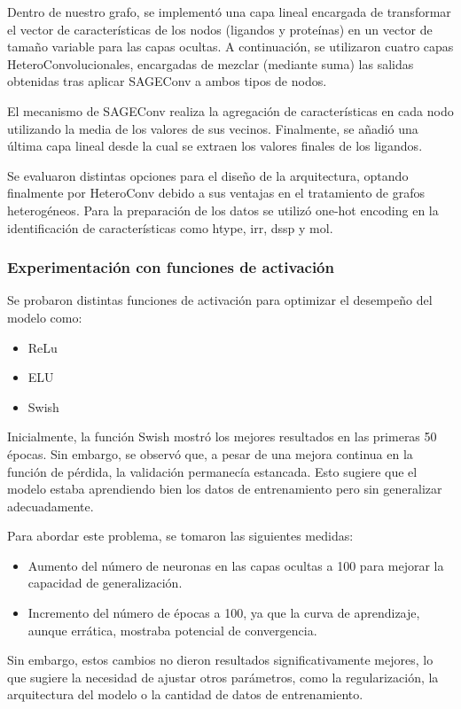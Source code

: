 \documentclass{article}
\begin{document}
Dentro de nuestro grafo, se implementó una capa lineal encargada de transformar el vector de características de los nodos
(ligandos y proteínas) en un vector de tamaño variable para las capas ocultas. A continuación, se utilizaron cuatro capas HeteroConvolucionales,
encargadas de mezclar (mediante suma) las salidas obtenidas tras aplicar SAGEConv a ambos tipos de nodos.

El mecanismo de SAGEConv realiza la agregación de características en cada nodo utilizando la media de los valores de sus vecinos.
Finalmente, se añadió una última capa lineal desde la cual se extraen los valores finales de los ligandos.

Se evaluaron distintas opciones para el diseño de la arquitectura, optando finalmente por HeteroConv debido a sus ventajas en el tratamiento
de grafos heterogéneos. Para la preparación de los datos se utilizó one-hot encoding en la identificación de características como htype, irr,
dssp y mol.

\subsubsection{Experimentación con funciones de activación}
Se probaron distintas funciones de activación para optimizar el desempeño del modelo como:
\begin{itemize}
    \item ReLu
    \item ELU
    \item Swish
\end{itemize}
Inicialmente, la función Swish mostró los mejores resultados en las primeras 50 épocas. Sin embargo, se observó que, a pesar de una mejora continua
en la función de pérdida, la validación permanecía estancada. Esto sugiere que el modelo estaba aprendiendo bien los datos de entrenamiento pero sin
generalizar adecuadamente.

Para abordar este problema, se tomaron las siguientes medidas:
\begin{itemize}
    \item Aumento del número de neuronas en las capas ocultas a 100 para mejorar la capacidad de generalización.
    \item Incremento del número de épocas a 100, ya que la curva de aprendizaje, aunque errática, mostraba potencial de convergencia.
\end{itemize}
Sin embargo, estos cambios no dieron resultados significativamente mejores, lo que sugiere la necesidad de ajustar otros parámetros, como la regularización, la arquitectura del modelo o la cantidad de datos de entrenamiento.
\end{document}
